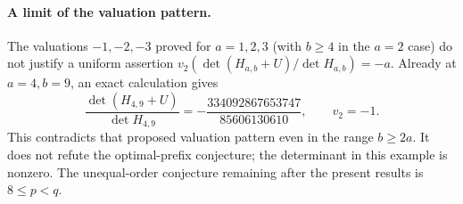 \paragraph{A limit of the valuation pattern.}
The valuations $-1,-2,-3$ proved for $a=1,2,3$ (with $b\ge4$
in the $a=2$ case) do not justify a
uniform assertion $v_2(\det(H_{a,b}+U)/\det H_{a,b})=-a$.
Already at $a=4,b=9$, an exact calculation gives
\[
 \frac{\det(H_{4,9}+U)}{\det H_{4,9}}
 =-\frac{334092867653747}{85606130610},
 \qquad v_2=-1.
\]
This contradicts that proposed valuation pattern even in the range
$b\ge2a$. It does not refute the optimal-prefix conjecture; the
determinant in this example is nonzero. The unequal-order conjecture
remaining after the present results is $8\le p<q$.
